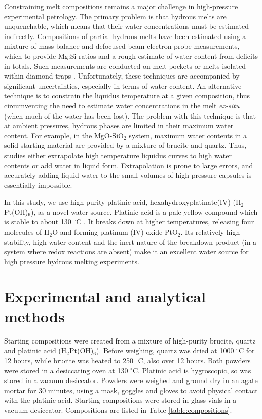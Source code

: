 \documentclass[review]{elsarticle}
\begin{document}
Constraining melt compositions remains a major challenge in high-pressure experimental petrology. The primary problem is that hydrous melts are unquenchable, which means that their water concentrations must be estimated indirectly. Compositions of partial hydrous melts have been estimated using a mixture of mass balance and defocused-beam electron probe measurements, which to provide Mg:Si ratios and a rough estimate of water content from deficits in totals. Such measurements are conducted on melt pockets \citep[e.g.][]{OMY2000, DDFK2005, LSOK2011} or melts isolated within diamond traps \citep{MSUP2007}. Unfortunately, these techniques are accompanied by significant uncertainties, especially in terms of water content. An alternative technique is to constrain the liquidus temperature at a given composition, thus circumventing the need to estimate water concentrations in the melt \emph{ex-situ} (when much of the water has been lost). The problem with this technique is that at ambient pressures, hydrous phases are limited in their maximum water content. For example, in the MgO-SiO$_2$ system, maximum water contents in a solid starting material are provided by a mixture of brucite and quartz. Thus, studies either extrapolate high temperature liquidus curves to high water contents or add water in liquid form. Extrapolation is prone to large errors, and accurately adding liquid water to the small volumes of high pressure capsules is essentially impossible. 

In this study, we use high purity platinic acid, hexahydroxyplatinate(IV) (H$_2$Pt(OH)$_6$), as a novel water source. Platinic acid is a pale yellow compound which is stable to about 130 $^{\circ}$C \citep{Nagano2002}. It breaks down at higher temperatures, releasing four molecules of H$_2$O and forming platinum (IV) oxide PtO$_2$. Its relatively high stability, high water content and the inert nature of the breakdown product (in a system where redox reactions are absent) make it an excellent water source for high pressure hydrous melting experiments.

\section{Experimental and analytical methods}
Starting compositions were created from a mixture of high-purity brucite, quartz and platinic acid (H$_2$Pt(OH)$_6$). Before weighing, quartz was dried at 1000 $^{\circ}$C for 12 hours, while brucite was heated to 250 $^{\circ}$C, also over 12 hours. Both powders were stored in a desiccating oven at 130 $^{\circ}$C. Platinic acid is hygroscopic, so was stored in a vacuum desiccator. Powders were weighed and ground dry in an agate mortar for 30 minutes, using a mask, goggles and gloves to avoid physical contact with the platinic acid. Starting compositions were stored in glass vials in a vacuum desiccator. Compositions are listed in Table \ref{table:compositions}.
\end{document}
